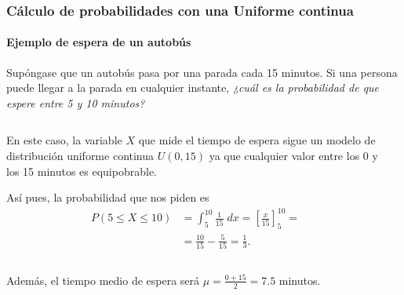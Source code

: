 \begin{frame}
\frametitle{Cálculo de probabilidades con una Uniforme continua}
\framesubtitle{Ejemplo de espera de un autobús}
Supóngase que un autobús pasa por una parada cada 15 minutos. Si una persona puede llegar a la parada en cualquier instante, \emph{¿cuál es
la probabilidad de que espere entre 5 y 10 minutos?}
\begin{columns}
\begin{column}{0.52\textwidth}
En este caso, la variable $X$ que mide el tiempo de espera sigue un modelo de distribución uniforme continua $U(0,15)$ ya que cualquier
valor entre los 0 y los 15 minutos es equipobrable.

Así pues, la probabilidad que nos piden es
\begin{align*}
P(5\leq X\leq 10) &= \int_{5}^{10} \frac{1}{15}\;dx = \left[\frac{x}{15}\right]_5^{10} = \\
&= \frac{10}{15}-\frac{5}{15} =\frac{1}{3}.
\end{align*}
\end{column}
\begin{column}{0.43\textwidth}
\begin{center}
\end{center}
\end{column}
\end{columns}
Además, el tiempo medio de espera será $\mu=\frac{0+15}{2}=7.5$ minutos.

\end{frame}
% 
% 
% 
